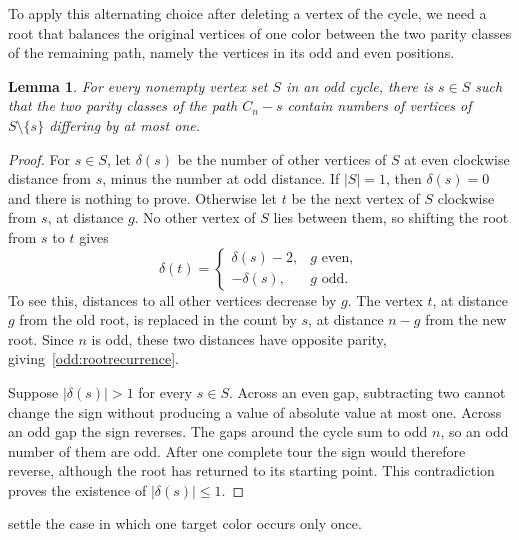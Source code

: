 \documentclass[10pt,a4paper]{amsart}
\numberwithin{equation}{section}
\newtheorem{lemma}[theorem]{Lemma}
\theoremstyle{definition}
\theoremstyle{remark}
\begin{document}
To apply this alternating choice after deleting a vertex of the cycle,
we need a root that balances the original vertices of one color between
the two parity classes of the remaining path, namely the vertices in
its odd and even positions.

\begin{lemma}\label{odd:root}
For every nonempty vertex set $S$ in an odd cycle, there is $s\in S$
such that the two parity classes of the path $C_n-s$ contain
numbers of vertices of $S\setminus\{s\}$ differing by at most one.
\end{lemma}
\begin{proof}
For $s\in S$, let $\delta(s)$ be the number of other vertices of $S$
at even clockwise distance from $s$, minus the number at odd distance.
If $|S|=1$, then $\delta(s)=0$ and there is nothing to prove.
Otherwise let $t$ be the next vertex of $S$ clockwise from $s$, at
distance $g$. No other vertex of $S$ lies between them, so shifting
the root from $s$ to $t$ gives
\begin{equation}\label{odd:rootrecurrence}
\delta(t)=
\begin{cases}
\delta(s)-2,&g\text{ even},\\
-\delta(s),&g\text{ odd}.
\end{cases}
\end{equation}
To see this, distances to all other vertices decrease by $g$.
The vertex $t$, at distance $g$ from the old root, is replaced in the
count by $s$, at distance $n-g$ from the new root. Since $n$ is odd,
these two distances have opposite parity, giving~\eqref{odd:rootrecurrence}.

Suppose $|\delta(s)|>1$ for every $s\in S$. Across an even gap,
subtracting two cannot change the sign without producing a value
of absolute value at most one. Across an odd gap the sign reverses.
The gaps around the cycle sum to odd $n$, so an odd number of them
are odd. After one complete tour the sign would therefore reverse,
although the root has returned to its starting point. This
contradiction proves the existence of $|\delta(s)|\le1$.
\end{proof}

 settle the case in which one
target color occurs only once.
\end{document}
